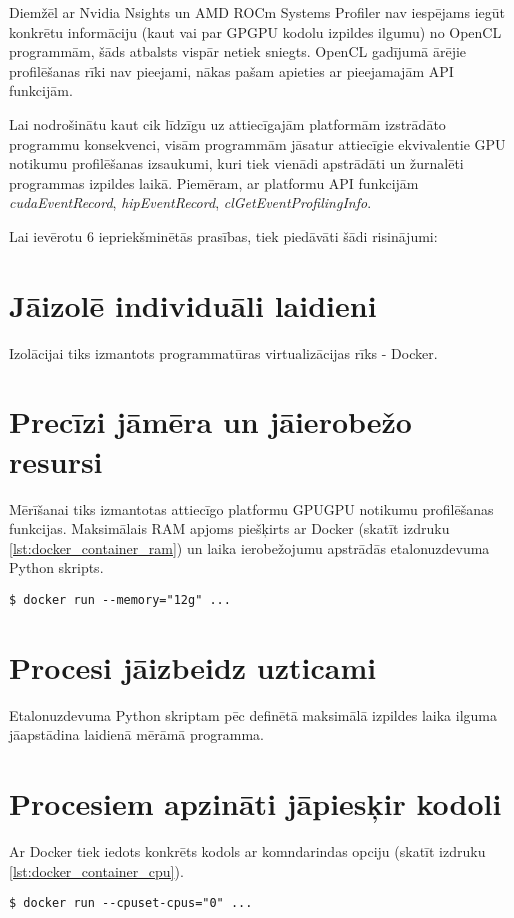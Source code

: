Diemžēl ar Nvidia Nsights un AMD ROCm Systems Profiler nav iespējams iegūt
konkrētu informāciju (kaut vai par GPGPU kodolu izpildes ilgumu) no OpenCL
programmām, šāds atbalsts vispār netiek
sniegts.\cite{rocm_sys_profiler_use_case} OpenCL gadījumā ārējie profilēšanas
rīki nav pieejami, nākas pašam apieties ar pieejamajām API funkcijām.

Lai nodrošinātu kaut cik līdzīgu uz attiecīgajām platformām izstrādāto
programmu konsekvenci, visām programmām jāsatur attiecīgie ekvivalentie GPU
notikumu profilēšanas izsaukumi, kuri tiek vienādi apstrādāti un žurnalēti
programmas izpildes laikā. Piemēram, ar platformu API funkcijām
\textit{cudaEventRecord}, \textit{hipEventRecord},
\textit{clGetEventProfilingInfo}.



Lai ievērotu 6 iepriekšminētās prasības, tiek piedāvāti šādi risinājumi:

\section{Jāizolē individuāli laidieni}
Izolācijai tiks izmantots programmatūras virtualizācijas rīks - Docker.
\cite{docker-docs-engine}

\section{Precīzi jāmēra un jāierobežo resursi}
Mērīšanai tiks izmantotas attiecīgo platformu GPUGPU notikumu profilēšanas
funkcijas. Maksimālais RAM apjoms piešķirts ar Docker (skatīt izdruku
\ref{lst:docker_container_ram}) un laika ierobežojumu apstrādās etalonuzdevuma
Python skripts.
\begin{lstlisting}[caption={Docker konteinera palaišana, piešķirot tam konkrēti
    12GiB RAM}, label=lst:docker_container_ram]
$ docker run --memory="12g" ...
\end{lstlisting}

\section{Procesi jāizbeidz uzticami}
Etalonuzdevuma Python skriptam pēc definētā maksimālā izpildes laika ilguma
jāapstādina laidienā mērāmā programma.

\section{Procesiem apzināti jāpiesķir kodoli}
Ar Docker tiek iedots konkrēts kodols ar komndarindas opciju (skatīt izdruku
\ref{lst:docker_container_cpu}).
\begin{lstlisting}[caption={Docker konteinera palaišana, piešķirot tam konkrēti
    pirmo CPU kodolu}, label=lst:docker_container_cpu]
$ docker run --cpuset-cpus="0" ...
\end{lstlisting}

